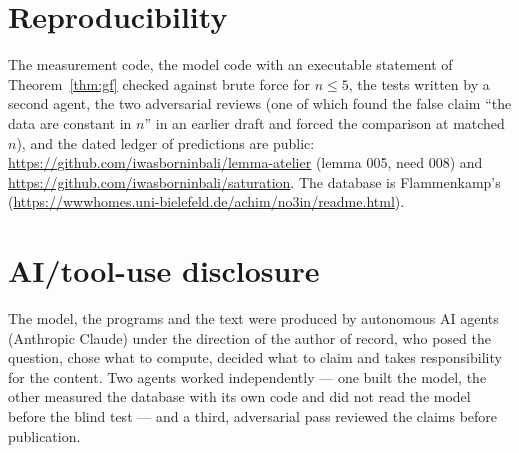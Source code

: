 \documentclass[11pt,a4paper]{article}
\begin{document}
\section{Reproducibility}
The measurement code, the model code with an executable statement of Theorem~\ref{thm:gf} checked against brute force
for $n\le5$, the tests written by a second agent, the two adversarial reviews (one of which found the false claim
``the data are constant in $n$'' in an earlier draft and forced the comparison at matched $n$), and the dated ledger of
predictions are public: \url{https://github.com/iwasborninbali/lemma-atelier} (lemma 005, need 008) and
\url{https://github.com/iwasborninbali/saturation}.  The database is Flammenkamp's
(\url{https://wwwhomes.uni-bielefeld.de/achim/no3in/readme.html}).

\section*{AI/tool-use disclosure}
The model, the programs and the text were produced by autonomous AI agents (Anthropic Claude) under the direction
of the author of record, who posed the question, chose what to compute, decided what to claim and takes responsibility
for the content.  Two agents worked independently --- one built the model, the other measured the database with its
own code and did not read the model before the blind test --- and a third, adversarial pass reviewed the claims
before publication.
\end{document}
